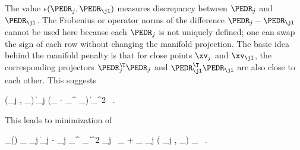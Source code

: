 The value \( \epsilon(\PEDR_{j} , \PEDR_{\jl}) \) measures discrepancy between \( \PEDR_{j} \) and \( \PEDR_{\jl} \).
The Frobenius or operator norms of the difference \( \PEDR_{j} - \PEDR_{\jl} \) cannot be used here because
each \( \PEDR_{j} \) is not uniquely defined; one can swap the sign of each row without changing the manifold projection. 
The basic idea behind the manifold penalty is that 
for close points \( \xv_{j} \) and  \( \xv_{\jl} \), the corresponding projectors  
\( \PEDR_{j}^{\T} \PEDR_{j} \) and \( \PEDR_{\jl}^{\T} \PEDR_{\jl} \) are also close to each other.  
This suggests
\begin{EQA}[c]
	\epsilon(\PEDR_{j} , \PEDR_{\jl})
	\eqdef
	\bigl\| \PEDR_{j} (\Id_{\dimd} - \PEDR_{\jl}^{\T} \PEDR_{\jl}) \bigr\|_{\Fr}^{2}
	\, .
\end{EQA}
This leads to minimization of %
\begin{EQA}[c]
	\LL_{\subM}(\prmtv)
	\eqdef
	\sum_{\jl \in \JJJ} \sum_{j \in \JJJ}
	\bigl\| \Imav_{j} - \UV_{j} \PEDR_{\jl}^{\T} \fclv_{\jjl} \bigr\|^{2} \neff_{j} \, \weightM_{\jjl}
	+ \lambda \sum_{\jl \in \JJJ} \sum_{j \in \JJJ} \epsilon( \PEDR_{j} , \PEDR_{\jl}) \; \weightM_{\jjl}
	\, .
\end{EQA}



